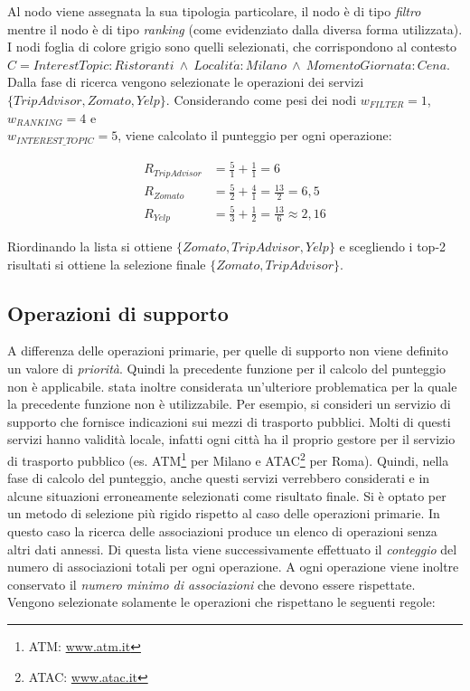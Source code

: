 Al nodo  viene assegnata la sua tipologia particolare, il nodo  è di tipo \emph{filtro} mentre il nodo  è di tipo \emph{ranking} (come evidenziato dalla diversa forma utilizzata). I nodi foglia di colore grigio sono quelli selezionati, che corrispondono al contesto $ C = InterestTopic: Ristoranti\ \land\ Localit\acute{a}: Milano\ \land\ MomentoGiornata: Cena $. Dalla fase di ricerca vengono selezionate le operazioni dei servizi $ \{TripAdvisor, Zomato, Yelp\} $. Considerando come pesi dei nodi $ w_{FILTER} = 1 $, $ w_{RANKING} = 4 $ e\\ $ w_{INTEREST\_TOPIC} = 5 $, viene calcolato il punteggio per ogni operazione:

\begin{align*}
R_{TripAdvisor} &= \frac{5}{1} + \frac{1}{1} = 6 \\
R_{Zomato} &= \frac{5}{2} + \frac{4}{1} = \frac{13}{2} = 6,5\\
R_{Yelp} &= \frac{5}{3} + \frac{1}{2} = \frac{13}{6} \approx 2,16
\end{align*} 

Riordinando la lista si ottiene $ \{ Zomato, TripAdvisor, Yelp \} $ e scegliendo i top-2 risultati si ottiene la selezione finale $ \{ Zomato, TripAdvisor \} $.

\subsection*{Operazioni di supporto}

A differenza delle operazioni primarie, per quelle di supporto non viene definito un valore di \emph{priorità}. Quindi la precedente funzione per il calcolo del punteggio non è applicabile. \upe stata inoltre considerata un'ulteriore problematica per la quale la precedente funzione non è utilizzabile. Per esempio, si consideri un servizio di supporto che fornisce indicazioni sui mezzi di trasporto pubblici. Molti di questi servizi hanno validità locale, infatti ogni città ha il proprio gestore per il servizio di trasporto pubblico (es. ATM\footnote{ATM: \url{www.atm.it}} per Milano e ATAC\footnote{ATAC: \url{www.atac.it}} per Roma). Quindi, nella fase di calcolo del punteggio, anche questi servizi verrebbero considerati e in alcune situazioni erroneamente selezionati come risultato finale. Si è optato per un metodo di selezione più rigido rispetto al caso delle operazioni primarie. In questo caso la ricerca delle associazioni produce un elenco di operazioni senza altri dati annessi. Di questa lista viene successivamente effettuato il \emph{conteggio} del numero di associazioni totali per ogni operazione. A ogni operazione viene inoltre conservato il \emph{numero minimo di associazioni} che devono essere rispettate. Vengono selezionate solamente le operazioni che rispettano le seguenti regole:

